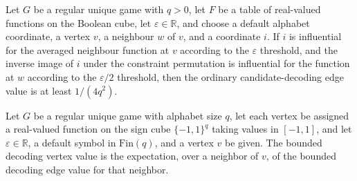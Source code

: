 \begin{theorem}
\label{FABL.RegularUniqueGame.one_div_four_mul_q_sq_le_boundedOrdinaryDecodingEdgeValue}
\leanok
{}
Let $G$ be a regular unique game with $q>0$, let $F$ be a table of real-valued functions
on the Boolean cube, let $\varepsilon\in\mathbb R$, and choose a default alphabet
coordinate, a vertex $v$, a neighbour $w$ of $v$, and a coordinate $i$. If $i$ is
influential for the averaged neighbour function at $v$ according to the $\varepsilon$
threshold, and the inverse image of $i$ under the constraint permutation is influential
for the function at $w$ according to the $\varepsilon/2$ threshold, then the ordinary
candidate-decoding edge value is at least $1/(4q^2)$.
\end{theorem}

\begin{definition}
\label{FABL.RegularUniqueGame.boundedOrdinaryDecodingVertexValue}
\leanok
{}
Let $G$ be a regular unique game with alphabet size $q$, let each vertex be assigned a
real-valued function on the sign cube $\{-1,1\}^q$ taking values in $[-1,1]$, and let
$\varepsilon\in\mathbb R$, a default symbol in $\mathrm{Fin}(q)$, and a vertex $v$
be given. The bounded decoding vertex value is the expectation, over a neighbor of $v$,
of the bounded decoding edge value for that neighbor.
\end{definition}

